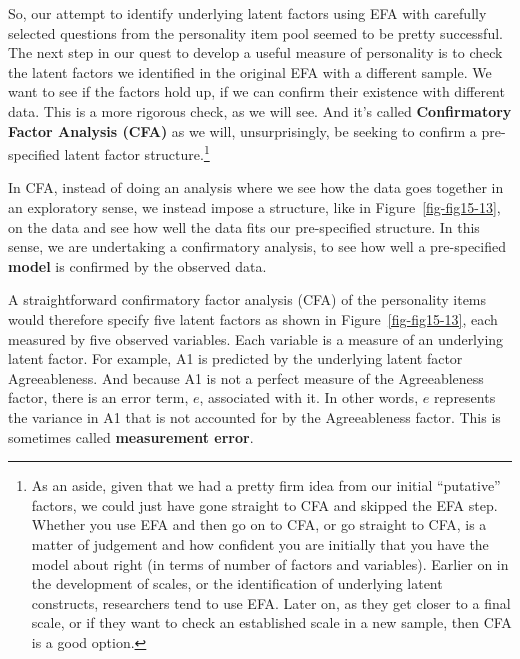 \documentclass[
  a4paper,
]{book}
\begin{document}
So, our attempt to identify underlying latent factors using EFA with
carefully selected questions from the personality item pool seemed to be
pretty successful. The next step in our quest to develop a useful
measure of personality is to check the latent factors we identified in
the original EFA with a different sample. We want to see if the factors
hold up, if we can confirm their existence with different data. This is
a more rigorous check, as we will see. And it's called
\textbf{Confirmatory Factor Analysis (CFA)} as we will, unsurprisingly,
be seeking to confirm a pre-specified latent factor
structure.\footnote{As an aside, given that we had a pretty firm idea
  from our initial ``putative'' factors, we could just have gone
  straight to CFA and skipped the EFA step. Whether you use EFA and then
  go on to CFA, or go straight to CFA, is a matter of judgement and how
  confident you are initially that you have the model about right (in
  terms of number of factors and variables). Earlier on in the
  development of scales, or the identification of underlying latent
  constructs, researchers tend to use EFA. Later on, as they get closer
  to a final scale, or if they want to check an established scale in a
  new sample, then CFA is a good option.}

In CFA, instead of doing an analysis where we see how the data goes
together in an exploratory sense, we instead impose a structure, like in
Figure~\ref{fig-fig15-13}, on the data and see how well the data fits
our pre-specified structure. In this sense, we are undertaking a
confirmatory analysis, to see how well a pre-specified \textbf{model} is
confirmed by the observed data.

A straightforward confirmatory factor analysis (CFA) of the personality
items would therefore specify five latent factors as shown in
Figure~\ref{fig-fig15-13}, each measured by five observed variables.
Each variable is a measure of an underlying latent factor. For example,
A1 is predicted by the underlying latent factor Agreeableness. And
because A1 is not a perfect measure of the Agreeableness factor, there
is an error term, \(e\), associated with it. In other words, \(e\)
represents the variance in A1 that is not accounted for by the
Agreeableness factor. This is sometimes called \textbf{measurement
error}.
\end{document}
